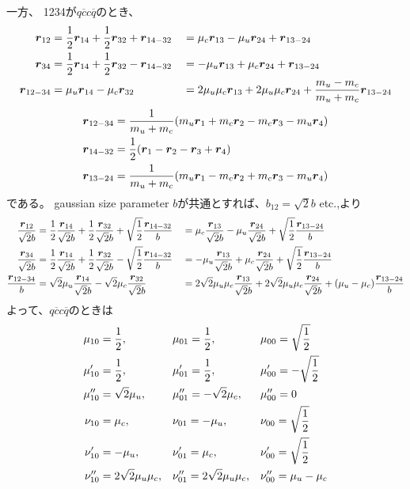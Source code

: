 \documentclass[a4j]{jarticle}
\def\cbar{\overline{{c}}}
\def\qbar{\overline{{q}}}
\newcommand{\xbld}[1]{\mbox{\boldmath $#1$}}
\def\vecr{{\xbld{r}}}
\def\half#1{\text{${#1\over 2}$}}
\begin{document}

一方、
1234が$q\cbar c\qbar$のとき、
\begin{align}
{\vecr_{12}}
 &={\half1}{\vecr_{14}}+{\half1}{\vecr_{32}}+{\vecr_{14-32}}
&&=   \mu_c{\vecr_{13}}   -\mu_u{\vecr_{24}}+{\vecr_{13-24}}
\\
{\vecr_{34}}
 &={\half1}{\vecr_{14}}+{\half1}{\vecr_{32}}-{\vecr_{14-32}}
&&=  -\mu_u{\vecr_{13}}   +\mu_c{\vecr_{24}}+{\vecr_{13-24}}
\\
{\vecr_{12-34}}
 &=\mu_u{\vecr_{14}}-\mu_c{\vecr_{32}}
&&=2\mu_u\mu_c{\vecr_{13}}+2\mu_u\mu_c{\vecr_{24}}+{m_u-m_c\over m_u+m_c}{\vecr_{13-24}}
\end{align}
\begin{align}
\vecr_{12-34}&= {1\over m_u+m_c} (m_u\vecr_1+m_c\vecr_2-m_c\vecr_3-m_u\vecr_4)
\\
\vecr_{14-32}&= {1\over 2} (\vecr_1-\vecr_2-\vecr_3+\vecr_4)
\\
\vecr_{13-24}&= {1\over m_u+m_c} (m_u\vecr_1-m_c\vecr_2+m_c\vecr_3-m_u\vecr_4)
\end{align}
である。
gaussian size parameter $b$が共通とすれば、$b_{12}=\sqrt{2}b$ etc.,より
\begin{align}
{\vecr_{12}\over \sqrt{2} b}&={\half1}{\vecr_{14}\over \sqrt{2} b}+{\half1}{\vecr_{32}\over \sqrt{2} b}+\sqrt{1\over 2}{\vecr_{14-32}\over  b}
&&=\mu_c{\vecr_{13}\over \sqrt{2} b}-\mu_u{\vecr_{24}\over \sqrt{2} b}+\sqrt{1\over 2}{\vecr_{13-24}\over  b}
\\
{\vecr_{34}\over \sqrt{2} b}&={\half1}{\vecr_{14}\over \sqrt{2} b}+{\half1}{\vecr_{32}\over \sqrt{2} b}-\sqrt{1\over 2}{\vecr_{14-32}\over  b}
&&=-\mu_u{\vecr_{13}\over \sqrt{2} b}+\mu_c{\vecr_{24}\over \sqrt{2} b}+\sqrt{1\over 2}{\vecr_{13-24}\over  b}
\\
{\vecr_{12-34}\over b}&={\sqrt{2}\mu_u}{\vecr_{14}\over \sqrt{2} b}-{\sqrt{2}\mu_c}{\vecr_{32}\over \sqrt{2} b}
&&=2\sqrt{2}\mu_u\mu_c{\vecr_{13}\over \sqrt{2} b}+2\sqrt{2}\mu_u\mu_c{\vecr_{24}\over \sqrt{2} b}
+{(\mu_u-\mu_c)}{\vecr_{13-24}\over  b}
\end{align}
よって、$q\cbar c\qbar$のときは
\begin{align}
\mu_{10}&=\half1, && \mu_{01}=\half1, &&\mu_{00}=\sqrt{1\over 2}
\\
\mu'_{10}&=\half1, && \mu'_{01}=\half1, &&\mu'_{00}=-\sqrt{1\over 2}
\\
\mu''_{10}&=\sqrt{2}\mu_u, && \mu''_{01}=-\sqrt{2}\mu_c, &&\mu''_{00}=0
\\
\nu_{10}&=\mu_c, && \nu_{01}=-\mu_u, &&\nu_{00}=\sqrt{1\over 2}
\\
\nu'_{10}&=-\mu_u, && \nu'_{01}=\mu_c, &&\nu'_{00}=\sqrt{1\over 2}
\\
\nu''_{10}&=2\sqrt{2}\mu_u\mu_c, && \nu''_{01}=2\sqrt{2}\mu_u\mu_c, &&\nu''_{00}=\mu_u-\mu_c
\end{align}
\end{document}
